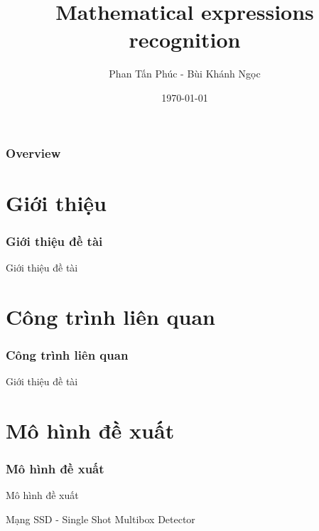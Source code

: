 \documentclass{beamer}
\title[Mathematical expressions recognition]{Mathematical expressions recognition }
\author{Phan Tấn Phúc - Bùi Khánh Ngọc} %
\institute[BKU] %
{
Ho Chi Minh City University of Technology \\ %
\medskip
\textit{\{phantanphuc2512, buikhanhngoc142\}@gmail.com} %
}
\date{\today} %
\begin{document}
\begin{frame}
\titlepage %
\end{frame}

\begin{frame}
\frametitle{Overview} %
\tableofcontents %
\end{frame}




\section{Giới thiệu}

\begin{frame}
	\frametitle{Giới thiệu đề tài}
	{\Huge Giới thiệu đề tài}
\end{frame}


\section{Công trình liên quan}
\begin{frame}
	\frametitle{Công trình liên quan}
	{\Huge Giới thiệu đề tài}
\end{frame}



\section{Mô hình đề xuất}
\begin{frame}
	\frametitle{Mô hình đề xuất}
	{\Huge Mô hình đề xuất}
	\hspace{10 cm}
	
	
	
	
	Mạng SSD - Single Shot Multibox Detector
\end{frame}
\end{document}
